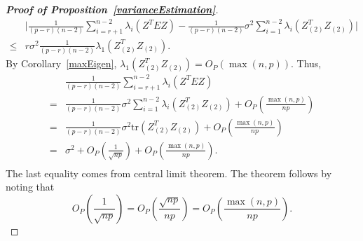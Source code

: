 \documentclass[review]{elsarticle}
\theoremstyle{plain}
\theoremstyle{definition}
\theoremstyle{remark}
\begin{document}
\begin{proof}[\textbf{Proof of Proposition~\ref{varianceEstimation}}]
\begin{equation*}
\begin{aligned}
             &\Big|\frac{1}{(p-r)(n-2)}\sum_{i=r+1}^{n-2}\lambda_i(Z^T E Z)-
    \frac{1}{(p-r)(n-2)} \sigma^2\sum_{i=1}^{n-2}\lambda_{i}(Z_{(2)}^T Z_{(2)})\Big|
             \\
             \leq & r\sigma^2\frac{1}{(p-r)(n-2)} \lambda_1 (Z_{(2)}^T Z_{(2)}).
         \end{aligned}
     \end{equation*}
    By Corollary~\ref{maxEigen}, $\lambda_1 (Z_{(2)}^T Z_{(2)})=O_P(\max(n,p))$. 
    Thus,
     \begin{equation*}
         \begin{aligned}
             &\frac{1}{(p-r)(n-2)}\sum_{i=r+1}^{n-2}\lambda_i(Z^T E Z)\\
             =&
    \frac{1}{(p-r)(n-2)} \sigma^2\sum_{i=1}^{n-2}\lambda_{i}(Z_{(2)}^T Z_{(2)})
             +O_P(\frac{\max(n,p)}{np})\\
             =&
             \frac{1}{(p-r)(n-2)} \sigma^2\mathrm{tr}(Z_{(2)}^T Z_{(2)})
             +O_P(\frac{\max(n,p)}{np})\\
             =&
             \sigma^2
                +O_P(\frac{1}{\sqrt{np}})
             +O_P(\frac{\max(n,p)}{np}).\\
         \end{aligned}
     \end{equation*}
     The last equality comes from central limit theorem.
The theorem follows by noting that
$$
    O_{P}(\frac{1}{\sqrt{np}})=O_P(\frac{\sqrt{np}}{np})= O_P(\frac{\max (n,p)}{np}).
$$
\end{proof}
\end{document}
